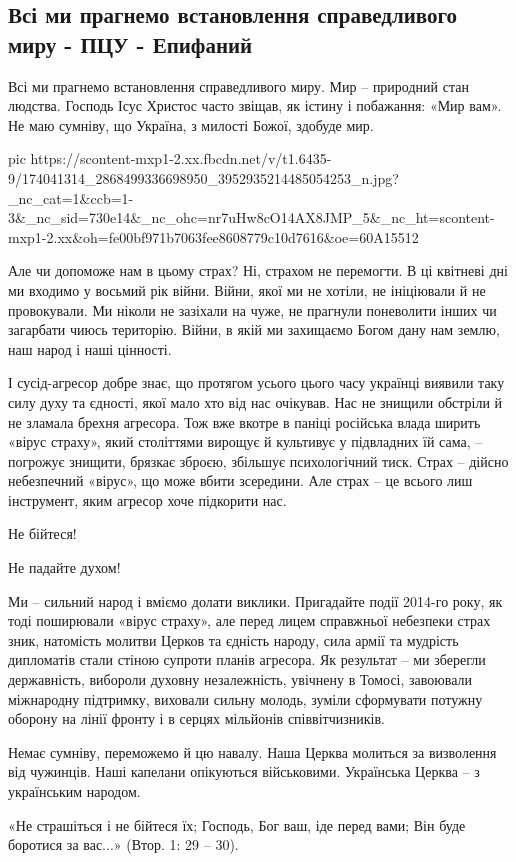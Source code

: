  
 
 
 
 
\subsection{Всі ми прагнемо встановлення справедливого миру - ПЦУ - Епифаний}

Всі ми прагнемо встановлення справедливого миру. Мир – природний стан людства.
Господь Ісус Христос часто звіщав, як істину і побажання: «Мир вам». Не маю
сумніву, що Україна, з милості Божої, здобуде мир.  

\ifcmt
  pic https://scontent-mxp1-2.xx.fbcdn.net/v/t1.6435-9/174041314_2868499336698950_3952935214485054253_n.jpg?_nc_cat=1&ccb=1-3&_nc_sid=730e14&_nc_ohc=nr7uHw8cO14AX8JMP_5&_nc_ht=scontent-mxp1-2.xx&oh=fe00bf971b7063fee8608779c10d7616&oe=60A15512
\fi

Але чи допоможе нам в цьому страх? Ні, страхом не перемогти.  В ці квітневі дні
ми входимо у восьмий рік війни. Війни, якої ми не хотіли, не ініціювали й не
провокували. Ми ніколи не зазіхали на чуже, не прагнули поневолити інших чи
загарбати чиюсь територію. Війни, в якій ми захищаємо Богом дану нам землю, наш
народ і наші цінності.     

І сусід-агресор добре знає, що протягом усього цього часу українці виявили таку
силу духу та єдності, якої мало хто від нас очікував. Нас не знищили обстріли й
не зламала брехня агресора. Тож вже вкотре в паніці російська влада ширить
«вірус страху», який століттями вирощує й культивує у підвладних їй сама, –
погрожує знищити, брязкає зброєю, збільшує психологічний тиск. Страх – дійсно
небезпечний «вірус», що може вбити зсередини. Але страх – це всього лиш
інструмент, яким агресор хоче підкорити нас. 

Не бійтеся! 

Не падайте духом! 

Ми – сильний народ і вміємо долати виклики. Пригадайте події 2014-го року, як
тоді поширювали «вірус страху», але перед лицем справжньої небезпеки страх
зник, натомість молитви Церков та єдність народу, сила армії та мудрість
дипломатів стали стіною супроти планів агресора. Як результат – ми зберегли
державність, вибороли духовну незалежність, увічнену в Томосі, завоювали
міжнародну підтримку, виховали сильну молодь, зуміли сформувати потужну оборону
на лінії фронту і в серцях мільйонів співвітчизників. 

Немає сумніву, переможемо й цю навалу. Наша Церква молиться за визволення від
чужинців. Наші капелани опікуються  військовими. Українська Церква – з
українським народом.  

«Не страшіться і не бійтеся їх; Господь, Бог ваш, іде перед вами; Він буде
боротися за вас...» (Втор. 1: 29 – 30).
